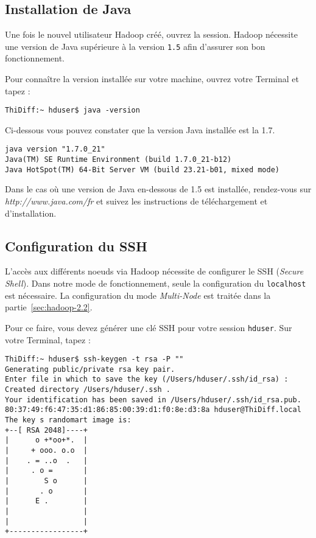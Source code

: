 \subsection{Installation de Java}

\par Une fois le nouvel utilisateur Hadoop créé, ouvrez la session. Hadoop nécessite une version de Java supérieure à la version \texttt{1.5} afin d'assurer son bon fonctionnement. 

\par Pour connaître la version installée sur votre machine, ouvrez votre Terminal et tapez :

\begin{verbatim}
ThiDiff:~ hduser$ java -version
\end{verbatim}

\par Ci-dessous vous pouvez constater que la version Java installée est la 1.7.

\begin{verbatim}
java version "1.7.0_21"
Java(TM) SE Runtime Environment (build 1.7.0_21-b12)
Java HotSpot(TM) 64-Bit Server VM (build 23.21-b01, mixed mode)
\end{verbatim}

\par Dans le cas où une version de Java en-dessous de 1.5 est installée, rendez-vous sur \emph{http://www.java.com/fr} et suivez les instructions de téléchargement et d'installation.

\subsection{Configuration du SSH}

\par L'accès aux différents noeuds via Hadoop nécessite de configurer le SSH (\emph{Secure Shell}). Dans notre mode de fonctionnement, seule la configuration du \texttt{localhost} est nécessaire. La configuration du mode \emph{Multi-Node} est traitée dans la partie~\ref{sec:hadoop-2.2}.

\par Pour ce faire, vous devez générer une clé SSH pour votre session \texttt{hduser}. Sur votre Terminal, tapez :

\begin{verbatim}
ThiDiff:~ hduser$ ssh-keygen -t rsa -P ""
Generating public/private rsa key pair.
Enter file in which to save the key (/Users/hduser/.ssh/id_rsa) :
Created directory /Users/hduser/.ssh .
Your identification has been saved in /Users/hduser/.ssh/id_rsa.pub.
80:37:49:f6:47:35:d1:86:85:00:39:d1:f0:8e:d3:8a hduser@ThiDiff.local
The key s randomart image is:
+--[ RSA 2048]----+
|      o +*oo+*.  |
|     + ooo. o.o  |
|    . = ..o  .   |
|     . o =       |
|        S o      |
|       . o       |
|      E .        |
|                 |
|                 |
+-----------------+
\end{verbatim}

